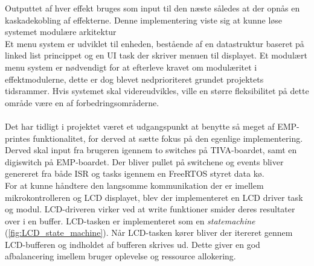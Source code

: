 Outputtet af hver effekt bruges som input til den næste således at der opnås en kaskadekobling af effekterne.
Denne implementering viste sig at kunne løse systemet modulære arkitektur 
\\
Et menu system er udviklet til enheden, bestående af en datastruktur baseret på linked list princippet og en UI task der skriver menuen til displayet.
Et modulært menu system er nødvendigt for at efterleve kravet om modulæritet i effektmodulerne, dette er dog blevet nedprioriteret grundet projektets tidsrammer.
Hvis systemet skal videreudvikles, ville en større fleksibilitet på dette område være en af forbedringsområderne.
\\
\\
Det har tidligt i projektet været et udgangspunkt at benytte så meget af EMP-printes funktionalitet, for derved at sætte fokus på den egenlige implementering. 
Derved skal input fra brugeren igennem to switches på TIVA-boardet, samt en digiswitch på EMP-boardet.
Der bliver pullet på switchene og events bliver genereret fra både ISR og tasks igennem en FreeRTOS styret data kø.
\\
For at kunne håndtere den langsomme kommunikation der er imellem mikrokontrolleren og LCD displayet, blev der implementeret en LCD driver task og modul. 
LCD-driveren virker ved at write funktioner smider deres resultater over i en buffer.
LCD-tasken er implementeret som en \textit{statemachine} (\ref{fig:LCD_state_machine}).
Når LCD-tasken kører bliver der itereret gennem LCD-bufferen og indholdet af bufferen skrives ud.
Dette giver en god afbalancering imellem bruger oplevelse og ressource allokering. 
